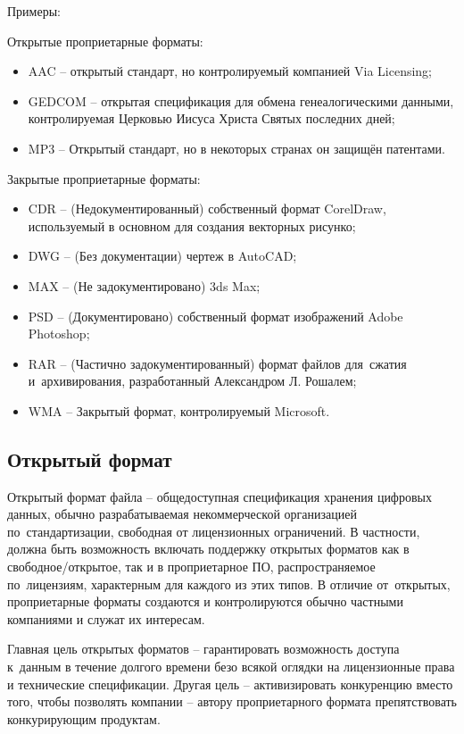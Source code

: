 \documentclass{ou}
\begin{document}
Примеры:

Открытые проприетарные форматы:
\begin{itemize}[label=-, leftmargin=0em, itemindent=3.35em, nosep]
\item AAC -- открытый стандарт, но контролируемый компанией Via Licensing;
\item GEDCOM -- открытая спецификация для обмена генеалогическими данными, контролируемая Церковью Иисуса Христа Святых последних дней;
\item MP3 -- Открытый стандарт, но в некоторых странах он защищён патентами.
\end{itemize}

Закрытые проприетарные форматы:
\begin{itemize}[label=-, leftmargin=0em, itemindent=3.35em, nosep]
\item CDR -- (Недокументированный) собственный формат CorelDraw, используемый в основном для создания векторных рисунко;
\item DWG -- (Без документации) чертеж в AutoCAD;
\item MAX -- (Не задокументировано) 3ds Max;
\item PSD -- (Документировано) собственный формат изображений Adobe Photoshop;
\item RAR -- (Частично задокументированный) формат файлов для~сжатия и~архивирования, разработанный Александром Л. Рошалем;
\item WMA -- Закрытый формат, контролируемый Microsoft.
\end{itemize}
\subsection{Открытый формат}
Открытый формат файла -- общедоступная спецификация хранения цифровых данных, обычно разрабатываемая некоммерческой организацией по~стандартизации, свободная от лицензионных ограничений. В частности, должна быть возможность включать поддержку открытых форматов как в свободное/открытое, так и в проприетарное ПО, распространяемое по~лицензиям, характерным для каждого из этих типов. В отличие от~открытых, проприетарные форматы создаются и контролируются обычно частными компаниями и служат их интересам.

Главная цель открытых форматов -- гарантировать возможность доступа к~данным в течение долгого времени безо всякой оглядки на лицензионные права и технические спецификации. Другая цель -- активизировать конкуренцию вместо того, чтобы позволять компании -- автору проприетарного формата препятствовать конкурирующим продуктам.
\end{document}
